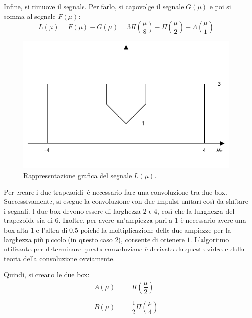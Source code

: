 \documentclass[a4paper]{article}
\begin{document}
	\noindent
	Infine, si rimuove il segnale. Per farlo, si capovolge il segnale $G\left(\mu\right)$ e poi si somma al segnale $F\left(\mu\right)$:
	\begin{equation*}
		L\left(\mu\right) = F\left(\mu\right) - G\left(\mu\right) = 3\Pi\left(\dfrac{\mu}{8}\right) - \Pi\left(\dfrac{\mu}{2}\right) - \Lambda\left(\dfrac{\mu}{1}\right)
	\end{equation*}
	\begin{figure}[!hpt]
		\centering
		\includegraphics[width=\textwidth]{img/fig_3.pdf}
		\caption*{Rappresentazione grafica del segnale $L\left(\mu\right)$.}
	\end{figure}
	
	\noindent
	Per creare i due trapezoidi, è necessario fare una convoluzione tra due box. Successivamente, si esegue la convoluzione con due impulsi unitari così da shiftare i segnali. I due box devono essere di larghezza $2$ e $4$, così che la lunghezza del trapezoide sia di $6$. Inoltre, per avere un'ampiezza pari a $1$ è necessario avere una box alta $1$ e l'altra di $0.5$ poiché la moltiplicazione delle due ampiezze per la larghezza più piccolo (in questo caso 2), consente di ottenere $1$. L'algoritmo utilizzato per determinare questa convoluzione è derivato da questo \href{https://youtu.be/nHahox9pCg0}{video} e dalla teoria della convoluzione ovviamente.\newline
	
	\noindent
	Quindi, si creano le due box:
	\begin{equation*}
		\begin{array}{lll}
			A\left(\mu\right) & = & \Pi\left(\dfrac{\mu}{2}\right) \\
			\\
			B\left(\mu\right) & = & \dfrac{1}{2}\Pi\left(\dfrac{\mu}{4}\right)
		\end{array}
	\end{equation*}\newpage
\end{document}
